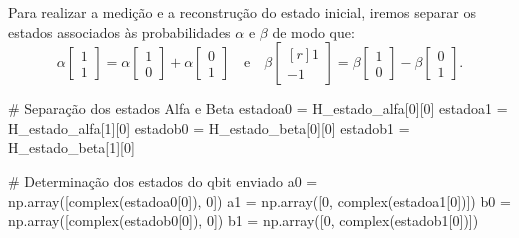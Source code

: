 Para realizar a medição e a reconstrução do estado inicial, iremos separar os estados associados às probabilidades \(\alpha\) e \(\beta\) de modo que:
\[
  \alpha \begin{bmatrix} 1 \\ 1 \end{bmatrix} = \alpha \begin{bmatrix} 1 \\ 0 \end{bmatrix} + \alpha \begin{bmatrix} 0 \\ 1 \end{bmatrix}
  \quad \text{e} \quad
  \beta \begin{bmatrix*}[r] 1 \\ -1 \end{bmatrix*} = \beta \begin{bmatrix} 1 \\ 0 \end{bmatrix} - \beta \begin{bmatrix} 0 \\ 1 \end{bmatrix}.
\]
\begin{pycode}
    # Separação dos estados Alfa e Beta
		estadoa0 = H_estado_alfa[0][0]
		estadoa1 = H_estado_alfa[1][0]
		estadob0 = H_estado_beta[0][0]
		estadob1 = H_estado_beta[1][0]

	# Determinação dos estados do qbit enviado
		a0 = np.array([complex(estadoa0[0]), 0])
		a1 = np.array([0, complex(estadoa1[0])])
		b0 = np.array([complex(estadob0[0]), 0])
		b1 = np.array([0, complex(estadob1[0])])
\end{pycode}

